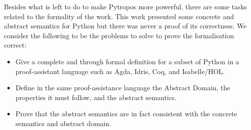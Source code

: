 
Besides what is left to do to make Pytropos more powerful, there are some tasks related to
the formality of the work. This work presented some concrete and abstract semantics for
Python but there was never a proof of its correctness. We consider the following to be the
problems to solve to prove the formalisation correct:

\begin{itemize}
\tightlist
\item Give a complete and through formal definition for a subset of Python in a
  proof-assistant language such as Agda, Idris, Coq, and Isabelle/HOL.
\item Define in the same proof-assistance language the Abstract Domain, the properties it
  must follow, and the abstract semantics.
\item Prove that the abstract semantics are in fact consistent with the concrete semantics
  and abstract domain.
\end{itemize}


